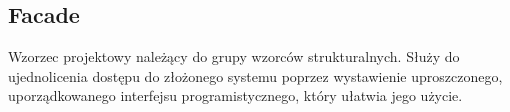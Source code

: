 \documentclass[a4paper, 11pt]{article}
\begin{document}
\subsection{Facade}
Wzorzec projektowy należący do grupy wzorców strukturalnych. Służy do ujednolicenia dostępu do złożonego systemu poprzez wystawienie uproszczonego, uporządkowanego interfejsu programistycznego, który ułatwia jego użycie.\\
	
	
\end{document}
